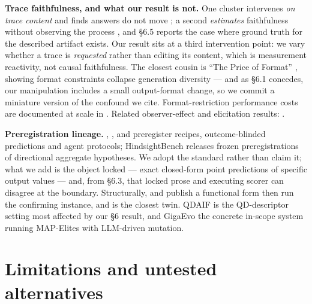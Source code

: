 \textbf{Trace faithfulness, and what our result is not.} One cluster intervenes \emph{on trace
content} and finds answers do not move
\citep{boppana2026reasoningtheaterdisentanglingmodel,khanzadeh2026projectariadnestructuralcausal,scalena2026commitmentboundaryprobingepiphenomenal,li2026chainholdsanswerfolds};
a second \emph{estimates} faithfulness without observing the process
\citep{arcuschin2026chainofthoughtreasoningwildfaithful}, and \S6.5 reports the case where ground
truth for the described artifact exists. Our result sits at a third intervention point: we vary
whether a trace is \emph{requested} rather than editing its content, which is measurement
reactivity, not causal faithfulness. The closest cousin is ``The Price of Format''
\citep{yun2025priceformatdiversitycollapse}, showing format constraints collapse generation
diversity --- and as \S6.1 concedes, our manipulation includes a small output-format change, so we
commit a miniature version of the confound we cite. Format-restriction performance costs are
documented at scale in \citet{tam2024letspeakfreelystudy}. Related observer-effect and elicitation results:
\citep{abdelnabi2025hawthorneeffectreasoningmodels,zhang2026verbalizedsamplingmitigatemode,wu2025answercentricreasoningdrivenuncoveringlatent}.

\textbf{Preregistration lineage.} \citet{thomas2026mitigatingllmbasedphackingpreregistering}, \citet{williams2026predictingllmsafetyrelease}, \citet{vaccaro2026preregistrationexperimentsaiagents} and \citet{zhang2026testingfrontierlargelanguage} preregister
recipes, outcome-blinded predictions and agent protocols; HindsightBench \citep{jia2026hindsightbenchblackboxbehavioralaudit} releases
frozen preregistrations of directional aggregate hypotheses. We adopt the standard rather than
claim it; what we add is the object locked --- exact closed-form point predictions of specific
output values --- and, from \S6.3, that locked prose and executing scorer can disagree at the
boundary. Structurally, \citet{kaplan2020scalinglawsneurallanguage} and \citet{hoffmann2022trainingcomputeoptimallargelanguage} publish a functional
form then run the confirming instance, and \citet{snell2024predictingemergentcapabilitiesfinetuning} is the closest twin. QDAIF
\citep{bradley2023qualitydiversityaifeedback} is the QD-descriptor setting most affected by our \S6 result, and GigaEvo
\citep{khrulkov2025gigaevoopensourceoptimization} the concrete in-scope system running MAP-Elites with LLM-driven mutation.

\section{Limitations and untested alternatives}

